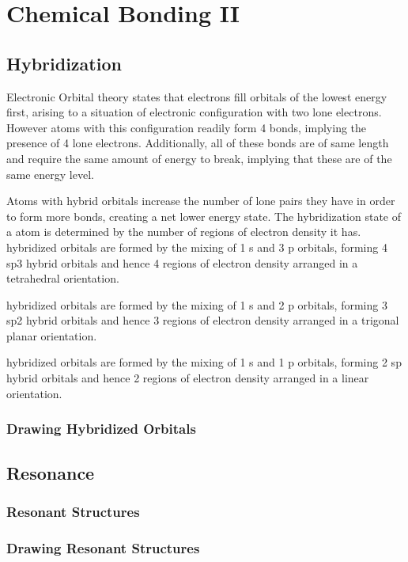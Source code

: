 \documentclass[../main]{subfiles}
\begin{document}
\section{Chemical Bonding II}

	\subsection{Hybridization}

	Electronic Orbital theory states that electrons fill orbitals of the lowest energy first, arising to a situation of electronic configuration  with two lone electrons. However atoms with this configuration readily form 4 bonds, implying the presence of 4 lone electrons. Additionally, all of these bonds are of same length and require the same amount of energy to break, implying that these are of the same energy level. \\


	Atoms with hybrid orbitals increase the number of lone pairs they have in order to form more bonds, creating a net lower energy state. The hybridization state of a atom is determined by the number of regions of electron density it has. \\

	 hybridized orbitals are formed by the mixing of 1 s and 3 p orbitals, forming 4 sp3 hybrid orbitals and hence 4 regions of electron density arranged in a tetrahedral orientation.

	 hybridized orbitals are formed by the mixing of 1 s and 2 p orbitals, forming 3 sp2 hybrid orbitals and hence 3 regions of electron density arranged in a trigonal planar orientation.

	 hybridized orbitals are formed by the mixing of 1 s and 1 p orbitals, forming 2 sp hybrid orbitals and hence 2 regions of electron density arranged in a linear orientation.

	\subsubsection{Drawing Hybridized Orbitals}

	\subsection{Resonance}

	\subsubsection{Resonant Structures}

	\subsubsection{Drawing Resonant Structures}
\end{document}
